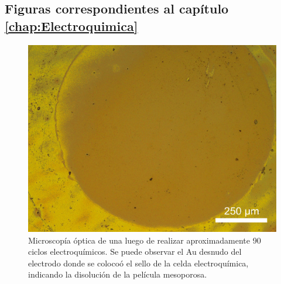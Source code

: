 		\clearpage\subsection*{Figuras correspondientes al capítulo \ref{chap:Electroquimica}}

			 \begin{figure}[h!]
			\centering
			\includegraphics[width=\textwidth]{Imagenes/agujero-pelado.jpg}
			\caption{Microscopía óptica de una \pdmF\space luego de realizar aproximadamente 90 ciclos electroquímicos. Se puede observar el Au desnudo del electrodo donde se colocoó el sello de la celda electroquímica, indicando la disolución de la película mesoporosa.}
			\label{fig:anexo-cirulo-pelado}
		    \end{figure} 	

